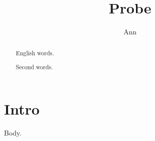 \documentclass{article}
\begin{document}
\title{Probe}\author{Ann}\maketitle
\begin{abstract}English words.\end{abstract}
\begin{abstract}Second words.\end{abstract}
\section{Intro}Body.
\end{document}
